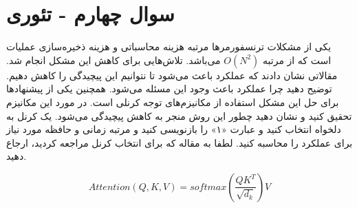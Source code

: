 \section{سوال چهارم - تئوری}

یکی از مشکلات ترنسفورمرها مرتبه هزینه محاسباتی و هزینه ذخیره‌سازی عملیات  است که از مرتبه $O(N^2)$ می‌باشد. تلاش‌هایی برای کاهش این مشکل انجام شد. مقالاتی نشان دادند که عملکرد  باعث می‌شود تا نتوانیم این پیچیدگی را کاهش دهیم. توضیح دهید چرا عملکرد  باعث وجود این مسئله می‌شود. همچنین یکی از پیشنهادها برای حل این مشکل استفاده از مکانیزم‌های توجه کرنلی است. در مورد این مکانیزم تحقیق کنید و نشان دهید چطور این روش منجر به کاهش پیچیدگی می‌شود. یک کرنل به دلخواه انتخاب کنید و عبارت «۱» را بازنویسی کنید و مرتبه زمانی و حافظه مورد نیاز برای عملکرد  را محاسبه کنید. لطفا به مقاله که برای انتخاب کرنل مراجعه کردید، ارجاع دهید.

\begin{equation}
	Attention(Q, K, V)=softmax(\frac{QK^T}{\sqrt{d_k}})V
\end{equation}





